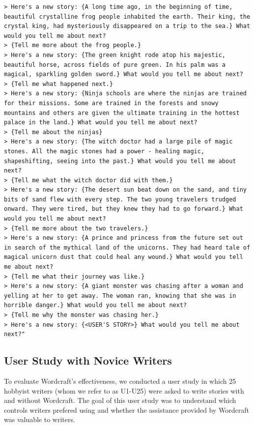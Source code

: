\begin{verbatim}
> Here's a new story: {A long time ago, in the beginning of time, beautiful crystalline frog people inhabited the earth. Their king, the crystal king, had mysteriously disappeared on a trip to the sea.} What would you tell me about next?
> {Tell me more about the frog people.}
> Here's a new story: {The green knight rode atop his majestic, beautiful horse, across fields of pure green. In his palm was a magical, sparkling golden sword.} What would you tell me about next?
> {Tell me what happened next.}
> Here's a new story: {Ninja schools are where the ninjas are trained for their missions. Some are trained in the forests and snowy mountains and others are given the ultimate training in the hottest palace in the land.} What would you tell me about next?
> {Tell me about the ninjas}
> Here's a new story: {The witch doctor had a large pile of magic stones. All the magic stones had a power - healing magic, shapeshifting, seeing into the past.} What would you tell me about next?
> {Tell me what the witch doctor did with them.}
> Here's a new story: {The desert sun beat down on the sand, and tiny bits of sand flew with every step. The two young travelers trudged onward. They were tired, but they knew they had to go forward.} What would you tell me about next?
> {Tell me more about the two travelers.}
> Here's a new story: {A prince and princess from the future set out in search of the mythical land of the unicorns. They had heard tale of magical unicorn dust that could heal any wound.} What would you tell me about next?
> {Tell me what their journey was like.}
> Here's a new story: {A giant monster was chasing after a woman and yelling at her to get away. The woman ran, knowing that she was in horrible danger.} What would you tell me about next?
> {Tell me why the monster was chasing her.}
> Here's a new story: {<USER'S STORY>} What would you tell me about next?"
\end{verbatim}

\subsection{User Study with Novice Writers}
To evaluate Wordcraft's effectiveness, we conducted a user study in which 25 hobbyist writers (whom we refer to as U1-U25) were asked to write stories with and without Wordcraft.
The goal of this user study was to understand which controls writers prefered using and whether the assistance provided by Wordcraft was valuable to writers.


